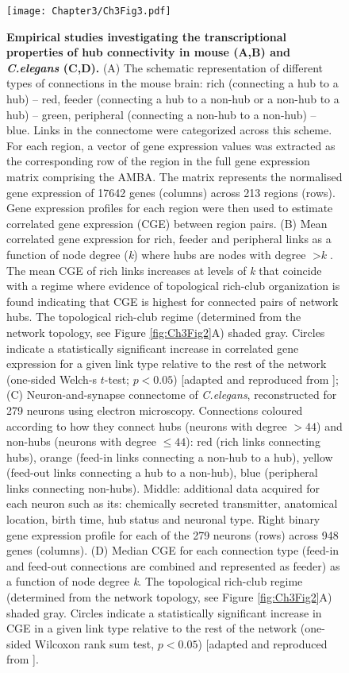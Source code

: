 \begin{figure}[!h]
\begin{center}
\texttt{[image: Chapter3/Ch3Fig3.pdf]}%
\end{center}
\caption{\textbf{Empirical studies investigating the transcriptional properties of hub connectivity in mouse (A,B) and \textit{C.elegans} (C,D).}
(A) The schematic representation of different types of connections in the mouse brain: rich (connecting a hub to a hub) -- red, feeder (connecting a hub to a non-hub or a non-hub to a hub) -- green, peripheral (connecting a non-hub to a non-hub) -- blue. Links in the connectome were categorized across this scheme. For each region, a vector of gene expression values was extracted as the corresponding row of the region in the full gene expression matrix comprising the AMBA. The matrix represents the normalised gene expression of \num{17642} genes (columns) across 213 regions (rows). Gene expression profiles for each region were then used to estimate correlated gene expression (CGE) between region pairs.
(B) Mean correlated gene expression for rich, feeder and peripheral links as a function of node degree (\textit{k}) where hubs are nodes with degree $> \textit{k}$. The mean CGE of rich links increases at levels of \textit{k} that coincide with a regime where evidence of topological rich-club organization is found indicating that CGE is highest for connected pairs of network hubs. The topological rich-club regime (determined from the network topology, see Figure \ref{fig:Ch3Fig2}A) shaded gray. Circles indicate a statistically significant increase in correlated gene expression for a given link type relative to the rest of the network (one-sided Welch-s $t$-test; $p < 0.05$) [adapted and reproduced from \citet{Fulcher2016}];
(C) Neuron-and-synapse connectome of \textit{C.elegans}, reconstructed for 279 neurons using electron microscopy. Connections coloured according to how they connect hubs (neurons with degree $> 44$) and non-hubs (neurons with degree $≤ 44$): red (rich links connecting hubs), orange (feed-in links connecting a non-hub to a hub), yellow (feed-out links connecting a hub to a non-hub), blue (peripheral links connecting non-hubs). Middle: additional data acquired for each neuron such as its: chemically secreted transmitter, anatomical location, birth time, hub status and neuronal type. Right binary gene expression profile for each of the 279 neurons (rows) across 948 genes (columns).
(D) Median CGE for each connection type (feed-in and feed-out connections are combined and represented as feeder) as a function of node degree \textit{k}. The topological rich-club regime (determined from the network topology, see Figure \ref{fig:Ch3Fig2}A) shaded gray.
Circles indicate a statistically significant increase in CGE in a given link type relative to the rest of the network (one-sided Wilcoxon rank sum test, $p < 0.05$) [adapted and reproduced from \citet{Arnatkeviciute2018}]. } \label{fig:Ch3Fig3}
\end{figure}


